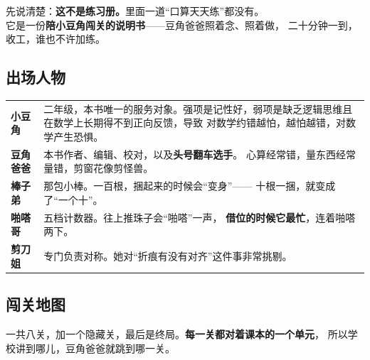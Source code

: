 
\begin{unitinfo}
先说清楚：\textbf{这不是练习册。}里面一道“口算天天练”都没有。\\
它是一份\textbf{陪小豆角闯关的说明书}——豆角爸爸照着念、照着做，
二十分钟一到，收工，谁也不许加练。
\end{unitinfo}

\subsection{出场人物}

\begin{center}
\begin{tabularx}{\linewidth}{@{}p{2.6cm}X@{}}
\toprule
\textbf{小豆角} & 二年级，本书唯一的服务对象。强项是记性好，弱项是缺乏逻辑思维且在数学上长期得不到正向反馈，导致
对数学约错越怕，越怕越错，对数学产生恐惧。 \\
\textbf{豆角爸爸} & 本书作者、编辑、校对，以及\textbf{头号翻车选手}。
心算经常错，量东西经常量错，剪窗花像剪怪兽。\\
\textbf{棒子弟} & 那包小棒。一百根，捆起来的时候会“变身”——
十根一捆，就变成了“一个十”。 \\
\textbf{啪嗒哥} & 五档计数器。往上推珠子会“啪嗒”一声，
\textbf{借位的时候它最忙}，连着啪嗒两下。 \\
\textbf{剪刀姐} & 专门负责对称。她对“折痕有没有对齐”这件事非常挑剔。 \\
\bottomrule
\end{tabularx}
\end{center}

\subsection{闯关地图}

一共八关，加一个隐藏关，最后是终局。\textbf{每一关都对着课本的一个单元}，
所以学校讲到哪儿，豆角爸爸就跳到哪一关。

